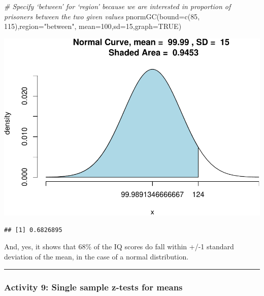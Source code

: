 \documentclass[
]{book}
\newenvironment{Shaded}{\begin{snugshade}}{\end{snugshade}}
\newcommand{\AttributeTok}[1]{\textcolor[rgb]{0.77,0.63,0.00}{#1}}
\newcommand{\CommentTok}[1]{\textcolor[rgb]{0.56,0.35,0.01}{\textit{#1}}}
\newcommand{\ConstantTok}[1]{\textcolor[rgb]{0.00,0.00,0.00}{#1}}
\newcommand{\DecValTok}[1]{\textcolor[rgb]{0.00,0.00,0.81}{#1}}
\newcommand{\FunctionTok}[1]{\textcolor[rgb]{0.00,0.00,0.00}{#1}}
\newcommand{\NormalTok}[1]{#1}
\newcommand{\StringTok}[1]{\textcolor[rgb]{0.31,0.60,0.02}{#1}}
\begin{document}
\begin{Shaded}
\begin{Highlighting}[]
\CommentTok{\# Specify ‘between’ for ‘region’ because we are interested in proportion of prisoners between the two given values}
\FunctionTok{pnormGC}\NormalTok{(}\AttributeTok{bound=}\FunctionTok{c}\NormalTok{(}\DecValTok{85}\NormalTok{, }\DecValTok{115}\NormalTok{),}\AttributeTok{region=}\StringTok{"between"}\NormalTok{, }\AttributeTok{mean=}\DecValTok{100}\NormalTok{,}\AttributeTok{sd=}\DecValTok{15}\NormalTok{,}\AttributeTok{graph=}\ConstantTok{TRUE}\NormalTok{)}
\end{Highlighting}
\end{Shaded}

\includegraphics{06-hypotheses_files/figure-latex/unnamed-chunk-25-1.pdf}

\begin{verbatim}
## [1] 0.6826895
\end{verbatim}

And, yes, it shows that 68\% of the IQ scores do fall within +/-1 standard deviation of the mean, in the case of a normal distribution.

\begin{center}\rule{0.5\linewidth}{0.5pt}\end{center}

\hypertarget{activity-9-single-sample-z-tests-for-means}{%
\subsubsection{Activity 9: Single sample z-tests for means}\label{activity-9-single-sample-z-tests-for-means}}
\end{document}
